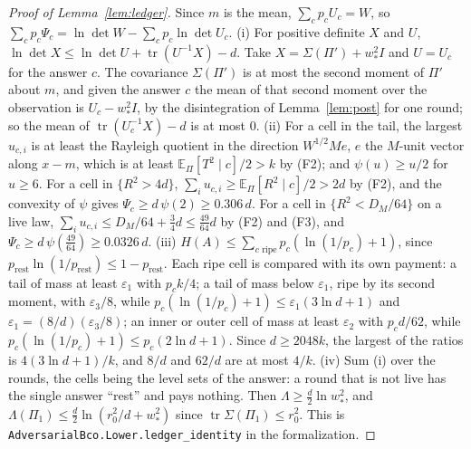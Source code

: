 \documentclass[11pt]{amsart}
\theoremstyle{definition}
\numberwithin{equation}{section}
\newcommand{\E}{\mathbb{E}}
\newcommand{\tr}{\operatorname{tr}}
\begin{document}
\begin{proof}[Proof of Lemma~\ref{lem:ledger}]
Since $m$ is the mean, $\sum_cp_cU_c=W$, so $\sum_cp_c\Psi_c=\ln\det W-\sum_cp_c\ln\det U_c$. (i) For positive definite $X$ and $U$, $\ln\det X\le\ln\det U+\tr(U^{-1}X)-d$. Take $X=\Sigma(\Pi')+w_*^2I$ and $U=U_c$ for the answer $c$. The covariance $\Sigma(\Pi')$ is at most the second moment of $\Pi'$ about $m$, and given the answer $c$ the mean of that second moment over the observation is $U_c-w_*^2I$, by the disintegration of Lemma~\ref{lem:post} for one round; so the mean of $\tr(U_c^{-1}X)-d$ is at most $0$. (ii) For a cell in the tail, the largest $u_{c,i}$ is at least the Rayleigh quotient in the direction $W^{1/2}Me$, $e$ the $M$-unit vector along $x-m$, which is at least $\E_\Pi[T^2\mid c]/2>k$ by (F2); and $\psi(u)\ge u/2$ for $u\ge6$. For a cell in $\{R^2>4d\}$, $\sum_iu_{c,i}\ge\E_\Pi[R^2\mid c]/2>2d$ by (F2), and the convexity of $\psi$ gives $\Psi_c\ge d\,\psi(2)\ge0.306\,d$. For a cell in $\{R^2<D_M/64\}$ on a live law, $\sum_iu_{c,i}\le D_M/64+\frac34d\le\frac{49}{64}d$ by (F2) and (F3), and $\Psi_c\ge d\,\psi(\frac{49}{64})\ge0.0326\,d$. (iii) $H(A)\le\sum_{c\text{ ripe}}p_c(\ln(1/p_c)+1)$, since $p_{\mathrm{rest}}\ln(1/p_{\mathrm{rest}})\le1-p_{\mathrm{rest}}$. Each ripe cell is compared with its own payment: a tail of mass at least $\varepsilon_1$ with $p_ck/4$; a tail of mass below $\varepsilon_1$, ripe by its second moment, with $\varepsilon_3/8$, while $p_c(\ln(1/p_c)+1)\le\varepsilon_1(3\ln d+1)$ and $\varepsilon_1=(8/d)(\varepsilon_3/8)$; an inner or outer cell of mass at least $\varepsilon_2$ with $p_cd/62$, while $p_c(\ln(1/p_c)+1)\le p_c(2\ln d+1)$. Since $d\ge2048k$, the largest of the ratios is $4(3\ln d+1)/k$, and $8/d$ and $62/d$ are at most $4/k$. (iv) Sum (i) over the rounds, the cells being the level sets of the answer: a round that is not live has the single answer ``rest'' and pays nothing. Then $\Lambda\ge\frac d2\ln w_*^2$, and $\Lambda(\Pi_1)\le\frac d2\ln(r_0^2/d+w_*^2)$ since $\tr\Sigma(\Pi_1)\le r_0^2$.
This is \texttt{AdversarialBco.Lower.ledger\_identity} in the formalization.
\end{proof}
\end{document}
